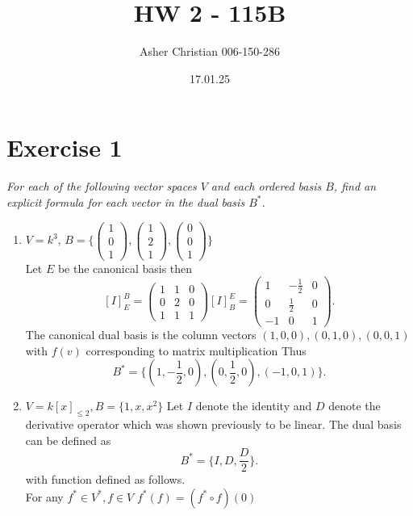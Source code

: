 \documentclass{article}
\title{HW 2 - 115B}
\author{Asher Christian 006-150-286}
\date{ 17.01.25}
\begin{document}
    \maketitle
    \section{Exercise 1}
    \emph{For each of the following vector spaces $V$ and each ordered basis
    $B$, find an explicit formula for each vector in the dual basis $B^{*}$.}\\
    \begin{enumerate}
        \item $V = k^{3}$, $B = \{ \begin{pmatrix} 1 \\ 0 \\ 1 \end{pmatrix}, \begin{pmatrix} 1 \\ 2 \\ 1 \end{pmatrix}, \begin{pmatrix} 0 \\ 0 \\ 1 \end{pmatrix}  \}$ \\
            Let $E$ be the canonical basis then
            \[
                [I]_E^{B} =
                \begin{pmatrix} 
                    1 & 1 & 0\\
                    0 & 2 & 0 \\
                    1 & 1 & 1
                \end{pmatrix} 
                [I]_B^{E} =
                \begin{pmatrix} 
                    1 & -\frac{1}{2} & 0\\
                    0 & \frac{1}{2} & 0\\
                    -1 & 0 & 1
                \end{pmatrix} 
            .\] 
            The canonical dual basis is the column vectors $(1,0,0), (0,1,0), (0,0,1)$ with $f(v)$ corresponding to matrix multiplication
            Thus
            \[
                B^{*} = \{(1,-\frac{1}{2},0) , (0,\frac{1}{2},0), (-1,0,1) \}
            .\] 
        \item $V = k[x]_{\le 2}, B = \{1,x,x^2\}$
            Let $I$ denote the identity and $D$ denote the derivative operator which was shown previously to be linear.
            The dual basis can be defined as
            \[
                B^{*} = \{I, D, \frac{D}{2}\}
            .\] 
            with function defined as follows.\\ For any $f^{*} \in V^{*}, f \in V$
            $f^{*}(f) = (f^{*} \circ f)(0)$
    \end{enumerate}
\end{document}
